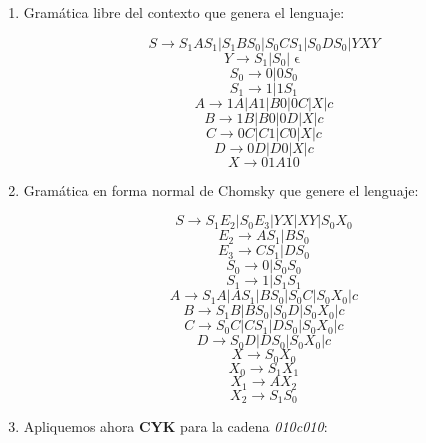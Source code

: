 \documentclass[11pt,a4paper]{article}
\let\epsilon\upvarepsilon
\begin{document}
\begin {enumerate} 

\item Gramática libre del contexto que genera el lenguaje:
	
$$ S \rightarrow S_1AS_1 | S_1BS_0 | S_0CS_1 | S_0DS_0 | YXY $$
$$ Y \rightarrow S_1 | S_0 | \epsilon $$
$$ S_0 \rightarrow 0 | 0S_0$$
$$ S_1 \rightarrow 1 | 1S_1$$
$$ A \rightarrow 1A | A1 | B0 | 0C | X | c $$
$$ B \rightarrow 1B | B0 | 0D | X | c $$
$$ C \rightarrow 0C | C1 | C0 | X | c $$
$$ D \rightarrow 0D | D0 | X | c $$
$$ X \rightarrow 01A10 $$


\item Gramática en forma normal de Chomsky que genere el lenguaje:

$$ S \rightarrow S_1E_2 | S_0E_3 | YX | XY | S_0X_0$$
$$ E_2 \rightarrow AS_1 | BS_0 $$
$$ E_3 \rightarrow CS_1 | DS_0 $$
$$ S_0 \rightarrow 0 | S_0S_0$$
$$ S_1 \rightarrow 1 | S_1S_1$$
$$ A \rightarrow S_1A | AS_1 | BS_0 | S_0C | S_0X_0 | c $$
$$ B \rightarrow S_1B | BS_0 | S_0D | S_0X_0 | c $$
$$ C \rightarrow S_0C | CS_1 | DS_0 | S_0X_0 | c $$
$$ D \rightarrow S_0D | DS_0 | S_0X_0 | c $$
$$ X \rightarrow S_0X_0$$
$$ X_0 \rightarrow S_1X_1$$
$$ X_1 \rightarrow AX_2$$
$$ X_2 \rightarrow S_1S_0$$

\item Apliquemos ahora \textbf{CYK} para la cadena \emph{010c010}:


\end{enumerate}
\end{document}
